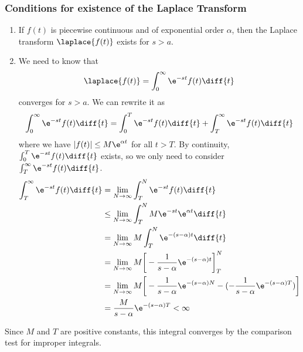 \documentclass{math}
\begin{document}
\subsubsection*{Conditions for existence of the Laplace Transform}
\begin{enumerate}
  \item If \( f(t) \) is piecewise continuous and of exponential order
  \( \alpha \), then the Laplace transform \( \laplace{f(t)} \) exists for
  \( s>a \).
  \item We need to know that
  \[ \laplace{f(t)} = \int_{0}^{\infty}\e^{-st}f(t)\diff{t} \]
  converges for \( s>a \). We can rewrite it as
  \[ \int_{0}^{\infty}\e^{-st}f(t)\diff{t} = \int_{0}^{T}\e^{-st}f(t)\diff{t}+
    \int_{T}^{\infty}\e^{-st}f(t)\diff{t} \]
  where we have \( |f(t)|\le M\e^{\alpha t} \) for all \( t > T \). By
  continuity, \( \int_{0}^{T}\e^{-st}f(t)\diff{t} \) exists, so we only need to
  consider \( \int_{T}^{\infty}\e^{-st}f(t)\diff{t} \).
  \begin{align*}
    \int_{T}^{\infty}\e^{-st}f(t)\diff{t} &=
      \lim_{N\to\infty}\int_{T}^{N}\e^{-st}f(t)\diff{t} \\
    &\le \lim_{N\to\infty}\int_{T}^{N}M\e^{-st}\e^{\alpha t}\diff{t} \\
    &= \lim_{N\to\infty}M\int_{T}^{N}\e^{-(s-\alpha)t}\diff{t} \\
    &= \lim_{N\to\infty}M\bigg[
      -\frac{1}{s-\alpha}\e^{-(s-\alpha)t}\bigg]_{T}^{N} \\
    &= \lim_{N\to\infty}M\bigg[-\frac{1}{s-\alpha}\e^{-(s-\alpha)N}-
      (-\frac{1}{s-\alpha}\e^{-(s-\alpha)T})\bigg] \\
    &= \frac{M}{s-\alpha}\e^{-(s-\alpha)T} < \infty
  \end{align*}
\end{enumerate}
Since \( M \) and \( T \) are positive constants, this integral converges by
the comparison test for improper integrals.
\end{document}
